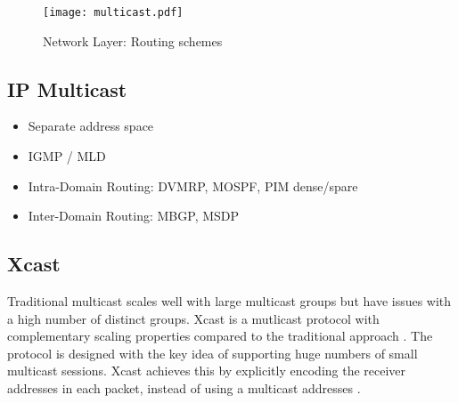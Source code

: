 \begin{figure}[h]
    \begin{center}
        \texttt{[image: multicast.pdf]}
    \end{center}
    \caption{Network Layer: Routing schemes}
    \label{fig:multicast}
\end{figure}


\subsection{IP Multicast} %
\label{sub:IP Multicast}
\begin{itemize}\itemsep0em
    \item Separate address space
    \item IGMP / MLD
    \item Intra-Domain Routing: DVMRP, MOSPF, PIM dense/spare
    \item Inter-Domain Routing: MBGP, MSDP
\end{itemize}



\subsection{Xcast}
\label{sub:Xcast}
Traditional multicast scales well with large multicast groups but have issues
with a high number of distinct groups.
Xcast is a mutlicast protocol with complementary scaling properties compared to
the traditional approach \cite{xcast_rfc}.
The protocol is designed with the key idea of supporting huge numbers of small
multicast sessions.
Xcast achieves this by explicitly encoding the receiver addresses in each
packet, instead of using a multicast addresses \cite{xcast_rfc}.


